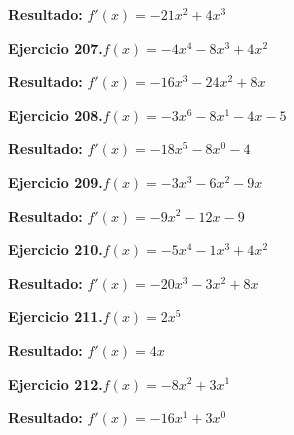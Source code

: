 \documentclass[10pt,a4paper]{article}
\begin{document}
\begin{solbox}
\textbf{Resultado:} \(\displaystyle f'(x) = -21x^{2} + 4x^{3}\)
\end{solbox}

\begin{ejbox}
\textbf{Ejercicio 207.}\quad $f(x) = -4x^4 -8x^3 +4x^2$
\end{ejbox}

\begin{solbox}
\textbf{Resultado:} \(\displaystyle f'(x) = -16x^3 -24x^2 +8x\)
\end{solbox}

\newpage
\begin{ejbox}
\textbf{Ejercicio 208.}\quad $f(x) = -3x^{6} -8x^{1} -4x -5$
\end{ejbox}

\begin{solbox}
\textbf{Resultado:} \(\displaystyle f'(x) = -18x^{5} -8x^{0} -4\)
\end{solbox}

\begin{ejbox}
\textbf{Ejercicio 209.}\quad $f(x) = -3x^{3} -6x^2 -9x$
\end{ejbox}

\begin{solbox}
\textbf{Resultado:} \(\displaystyle f'(x) = -9x^{2} -12x -9\)
\end{solbox}

\begin{ejbox}
\textbf{Ejercicio 210.}\quad $f(x) = -5x^4 -1x^3 +4x^2$
\end{ejbox}

\begin{solbox}
\textbf{Resultado:} \(\displaystyle f'(x) = -20x^3 -3x^2 +8x\)
\end{solbox}

\newpage
\begin{ejbox}
\textbf{Ejercicio 211.}\quad $f(x) = 2x^{5}$
\end{ejbox}

\begin{solbox}
\textbf{Resultado:} \(\displaystyle f'(x) = 4x\)
\end{solbox}

\begin{ejbox}
\textbf{Ejercicio 212.}\quad $f(x) = -8x^{2} +3x^{1}$
\end{ejbox}

\begin{solbox}
\textbf{Resultado:} \(\displaystyle f'(x) = -16x^{1} +3x^{0}\)
\end{solbox}
\end{document}
